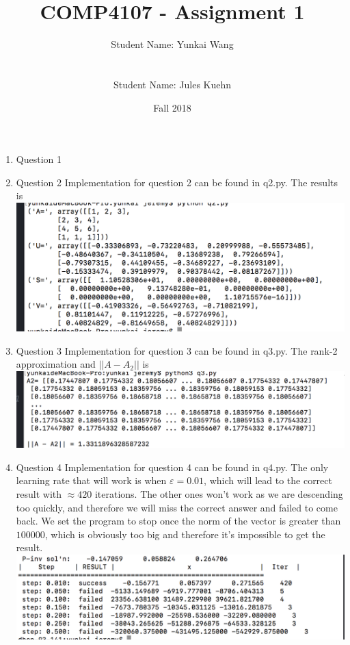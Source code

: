 \documentclass[11pt]{article}
\title{COMP4107 - Assignment 1}
\author{Student Name: Yunkai Wang\\
\text{Student Number: 100968473}\\\\
Student Name: Jules Kuehn\\
\text{Student Number: 100661464}}
\date{Fall 2018}
\begin{document}
\maketitle
\begin{enumerate}

\item Question 1

\item Question 2\newline
Implementation for question 2 can be found in q2.py. The results is\\
\includegraphics{q2_result}

\item Question 3\newline
Implementation for question 3 can be found in q3.py. The rank-2 approximation and $||A-A_2||$ is\\
\includegraphics{q3_result}

\item Question 4\newline
Implementation for question 4 can be found in q4.py. The only learning rate that will work is when $ε = 0.01$, which will lead to the correct result with $\approx 420$ iterations. The other ones won't work as we are descending too quickly, and therefore we will miss the correct answer and failed to come back. We set the program to stop once the norm of the vector is greater than $100000$, which is obviously too big and therefore it's impossible to get the result.
\includegraphics{q4_result}


\end{enumerate}
\end{document}
